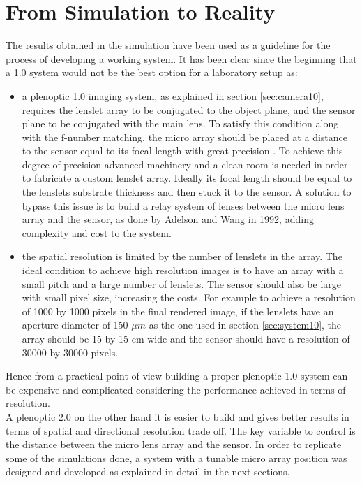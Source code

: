 \section{From Simulation to Reality}
The results obtained in the simulation have been used as a guideline for the process of developing a working system. It has been clear since the beginning that a 1.0 system would not be the best option for a laboratory setup as:
\begin{itemize}
	\item a plenoptic 1.0 imaging system, as explained in section \ref{sec:camera10}, requires the lenslet array to be conjugated to the object plane, and the sensor plane to be conjugated with the main lens. To satisfy this condition along with the f-number matching, the micro array should be placed at a distance to the sensor equal to its focal length with great precision \cite{ng2006digital,ng2005light,levoy1996light,levoy2006microscope}. To achieve this degree of precision advanced machinery and a clean room is needed in order to fabricate a custom lenslet array. Ideally its focal length should be equal to the lenslets substrate thickness and then stuck it to the sensor. A solution to bypass this issue is to build a relay system of lenses between the micro lens array and the sensor, as done by Adelson and Wang in 1992, \cite{adelson1992single} adding complexity and cost to the system.
	\item the spatial resolution is limited by the number of lenslets in the array. The ideal condition to achieve high resolution images is to have an array with a small pitch and a large number of lenslets. The sensor should also be large with small pixel size, increasing the costs. For example to achieve a resolution of 1000 by 1000 pixels in the final rendered image, if the lenslets have an aperture diameter of 150 $\mu m$ as the one used in section \ref{sec:system10}, the array should be 15 by 15 cm wide and the sensor should have a resolution of 30000 by 30000 pixels.
\end{itemize}
Hence from a practical point of view building a proper plenoptic 1.0 system can be expensive and complicated considering the performance achieved in terms of resolution. \\
A plenoptic 2.0 on the other hand it is easier to build and gives better results in terms of spatial and directional resolution trade off. The key variable to control is the distance between the micro lens array and the sensor. In order to replicate some of the simulations done, a system with a tunable micro array position was designed and developed as explained in detail in the next sections.
